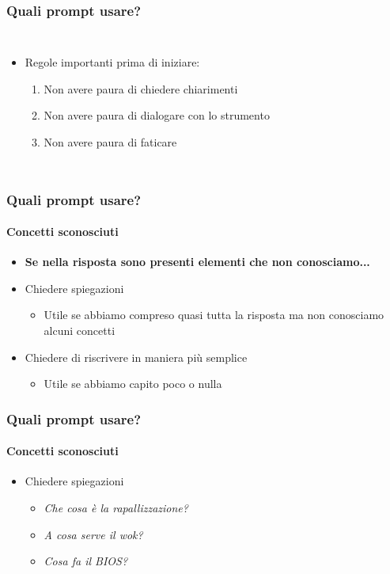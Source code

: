 \begin{contentframe}
    \frametitle{Quali prompt usare?}

    \begin{columns}
        \begin{itemize}
            \item Regole importanti prima di iniziare:
            \begin{enumerate}
                \item Non avere paura di chiedere chiarimenti 
                \item Non avere paura di dialogare con lo strumento
                \item Non avere paura di faticare
            \end{enumerate}
        \end{itemize}
        
        \centering
    \end{columns}
\end{contentframe}

\begin{contentframe}
    \frametitle{Quali prompt usare?}
    \framesubtitle{Concetti sconosciuti}
    
    \begin{itemize}
        \item \textbf{Se nella risposta sono presenti elementi che non conosciamo...}

        \bigskip
        \item Chiedere spiegazioni
        \begin{itemize}
            \item Utile se abbiamo compreso quasi tutta la risposta ma non conosciamo alcuni concetti
        \end{itemize}
        
        \item Chiedere di riscrivere in maniera più semplice
        \begin{itemize}
            \item Utile se abbiamo capito poco o nulla
        \end{itemize}
    \end{itemize}
\end{contentframe}

\begin{exampleframe}
    \frametitle{Quali prompt usare?}
    \framesubtitle{Concetti sconosciuti}

    \begin{itemize}
        \item Chiedere spiegazioni
        \begin{itemize}
            \item \textit{Che cosa è la rapallizzazione?}
            \item \textit{A cosa serve il wok?}
            \item \textit{Cosa fa il BIOS?}
        \end{itemize}
    \end{itemize}
\end{exampleframe}

